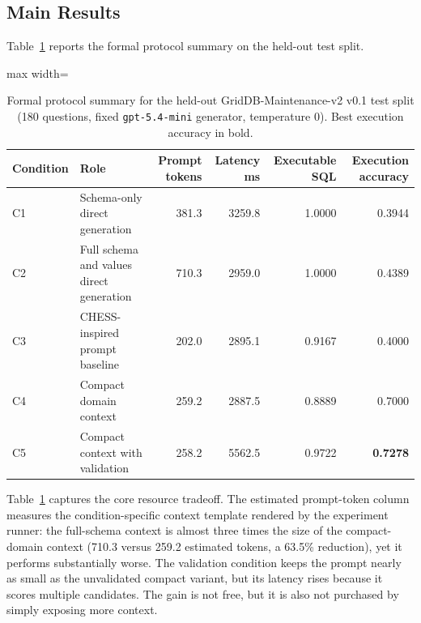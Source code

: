 \documentclass[cmc,article,submit,moreauthors,pdftex]{Definitions/tsp}
\begin{document}
\subsection{Main Results}\label{sect:r1}

Table~\ref{tab:main-results} reports the formal protocol summary on the held-out test split.

\begin{table}[H]
\tablesize{\small}
\caption{Formal protocol summary for the held-out GridDB-Maintenance-v2 v0.1 test split (180 questions, fixed \texttt{gpt-5.4-mini} generator, temperature 0). Best execution accuracy in bold.}
\label{tab:main-results}
\centering
\begin{adjustbox}{max width=\textwidth}
\begin{tabular}{llrrrr}
\toprule
\textbf{Condition} & \textbf{Role} & \textbf{Prompt tokens} & \textbf{Latency ms} & \textbf{Executable SQL} & \textbf{Execution accuracy} \\
\midrule
C1 & Schema-only direct generation & 381.3 & 3259.8 & 1.0000 & 0.3944 \\
C2 & Full schema and values direct generation & 710.3 & 2959.0 & 1.0000 & 0.4389 \\
C3 & CHESS-inspired prompt baseline & 202.0 & 2895.1 & 0.9167 & 0.4000 \\
C4 & Compact domain context & 259.2 & 2887.5 & 0.8889 & 0.7000 \\
C5 & Compact context with validation & 258.2 & 5562.5 & 0.9722 & \textbf{0.7278} \\
\bottomrule
\end{tabular}
\end{adjustbox}
\end{table}

Table~\ref{tab:main-results} captures the core resource tradeoff. The estimated prompt-token column measures the condition-specific context template rendered by the experiment runner: the full-schema context is almost three times the size of the compact-domain context (710.3 versus 259.2 estimated tokens, a 63.5\% reduction), yet it performs substantially worse. The validation condition keeps the prompt nearly as small as the unvalidated compact variant, but its latency rises because it scores multiple candidates. The gain is not free, but it is also not purchased by simply exposing more context.
\end{document}

